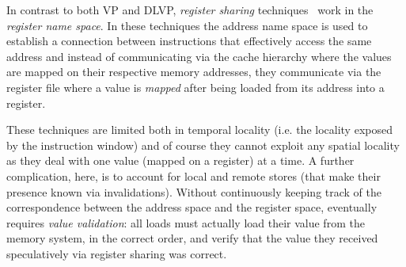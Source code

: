 \documentclass{sig-alternate}
\begin{document}
In contrast to both VP and DLVP, \emph{register sharing} techniques~\cite{RS/jourdan98novel, RS/petric02three, RS/petric05reno, RS/fahs05continuous, RS/perais16register} work in the \emph{register name space}. In these techniques the address name space is used to establish a connection between instructions that effectively access the same address and instead of communicating via the cache hierarchy where the values are mapped on their respective memory addresses, they communicate via the register file where a value is \emph{mapped} after being loaded from its address into a register.

These techniques are limited both in temporal locality (i.e. the locality exposed by the instruction window) and of course they cannot exploit any spatial locality as they deal with one value (mapped on a register) at a time.
A further complication, here, is to account for local and remote stores (that make their presence known via invalidations). Without continuously keeping track of the correspondence between the address space and the register space,  eventually requires \emph{value validation}: all loads must actually load their value from the memory system, in the correct order, and verify that the value they received speculatively via register sharing was correct.
\end{document}
